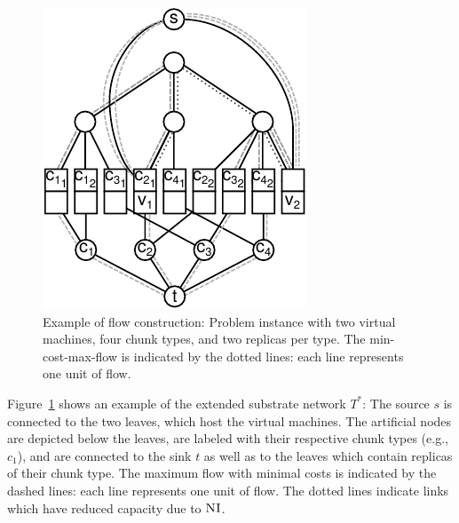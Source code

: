 \documentclass[9pt,twocolumn]{scrartcl}
\newcommand{\Source}{\ensuremath{s}}
\newcommand{\Sink}{\ensuremath{t}}
\newcommand{\achunk}{\ensuremath{c}}
\newcommand{\CC}{\textsc{NI}}
\newcommand{\Tree}{\ensuremath{T}}
\begin{document}
\begin{figure}
\includegraphics[width=\columnwidth]{figs/flow_ma_cv}
\caption{Example of flow construction: Problem instance with two virtual machines, four chunk
types, and two replicas per type. The min-cost-max-flow 
is indicated by the dotted lines: each line represents one unit of flow.}
\label{fig:flow_construction}
\end{figure}

Figure~\ref{fig:flow_construction} shows an example of the extended substrate
network $\Tree^*$: The source $\Source$ is connected to the two leaves, which host the
virtual machines. The artificial nodes are depicted below the leaves, are labeled with
their respective chunk types (e.g., $\achunk_1$), and are connected to the sink
$\Sink$ as well as to the leaves which contain replicas of their chunk type. 
The
maximum flow with minimal costs is indicated by the dashed lines: each line
represents one unit of flow. The dotted lines indicate links which have reduced
capacity due to $\CC$.
\end{document}
